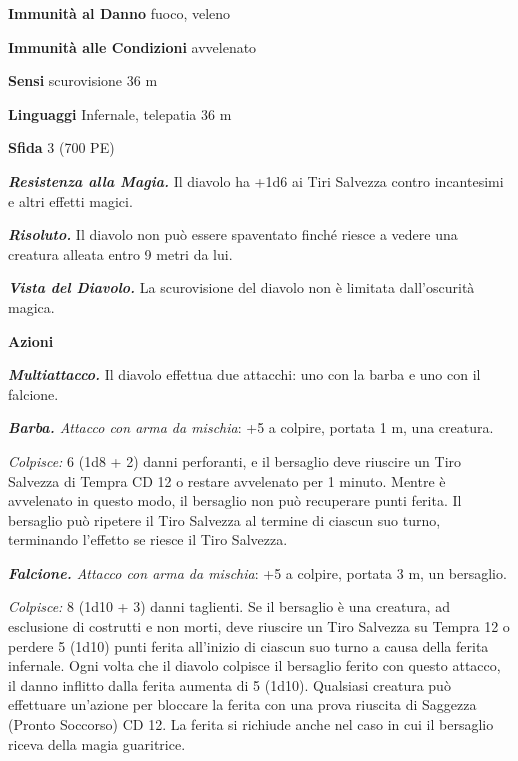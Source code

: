 \begin{multicols}{2}
\textbf{Immunità al Danno} fuoco, veleno

\textbf{Immunità alle Condizioni} avvelenato

\textbf{Sensi} scurovisione 36 m

\textbf{Linguaggi} Infernale, telepatia 36 m

\textbf{Sfida} 3 (700 PE)

\emph{\textbf{Resistenza alla Magia.}} Il diavolo ha +1d6 ai Tiri Salvezza contro incantesimi e altri effetti magici.

\emph{\textbf{Risoluto.}} Il diavolo non può essere spaventato finché riesce a vedere una creatura alleata entro 9 metri da lui.

\emph{\textbf{Vista del Diavolo.}} La scurovisione del diavolo non è limitata dall'oscurità magica.

\textbf{Azioni}

\emph{\textbf{Multiattacco.}} Il diavolo effettua due attacchi: uno con la barba e uno con il falcione.

\emph{\textbf{Barba.} Attacco con arma da mischia}: +5 a colpire, portata 1 m, una creatura.

\emph{Colpisce:} 6 (1d8 + 2) danni perforanti, e il bersaglio deve riuscire un Tiro Salvezza di Tempra CD 12 o restare avvelenato per 1 minuto. Mentre è avvelenato in questo modo, il bersaglio non può recuperare punti ferita. Il bersaglio può ripetere il Tiro Salvezza al termine di ciascun suo turno, terminando l'effetto se riesce il Tiro Salvezza.

\emph{\textbf{Falcione.} Attacco con arma da mischia}: +5 a colpire, portata 3 m, un bersaglio.

\emph{Colpisce:} 8 (1d10 + 3) danni taglienti. Se il bersaglio è una creatura, ad esclusione di costrutti e non morti, deve riuscire un Tiro Salvezza su Tempra 12 o perdere 5 (1d10) punti ferita all'inizio di ciascun suo turno a causa della ferita infernale. Ogni volta che il diavolo colpisce il bersaglio ferito con questo attacco, il danno inflitto dalla ferita aumenta di 5 (1d10). Qualsiasi creatura può effettuare un'azione per bloccare la ferita con una prova riuscita di Saggezza (Pronto Soccorso) CD 12. La ferita si richiude anche nel caso in cui il bersaglio riceva della magia guaritrice.


\end{multicols}
